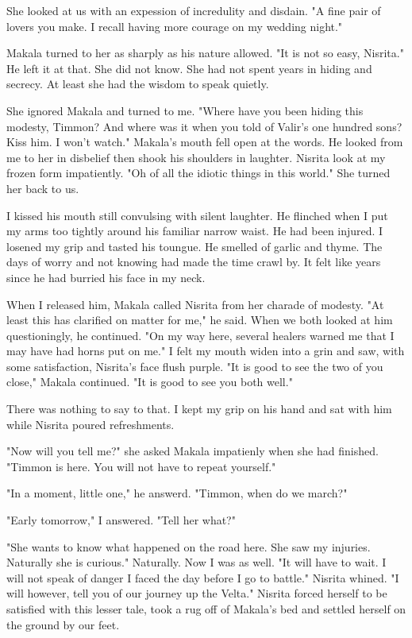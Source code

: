 \documentclass{article}
\begin{document}
She looked at us with an expession of incredulity and disdain. "A fine pair of lovers you make. I recall having more courage on my wedding night." 

Makala turned to her as sharply as his nature allowed. "It is not so easy, Nisrita." He left it at that. She did not know. She had not spent years in hiding and secrecy. At least she had the wisdom to speak quietly.

She ignored Makala and turned to me. "Where have you been hiding this modesty, Timmon? And where was it when you told of Valir's one hundred sons? Kiss him. I won't watch." Makala's mouth fell open at the words. He looked from me to her in disbelief then shook his shoulders in laughter. Nisrita look at my frozen form impatiently. "Oh of all the idiotic things in this world." She turned her back to us.

I kissed his mouth still convulsing with silent laughter. He flinched when I put my arms too tightly around his familiar narrow waist. He had been injured. I losened my grip and tasted his toungue. He smelled of garlic and thyme. The days of worry and not knowing had made the time crawl by. It felt like years since he had burried his face in my neck.

When I released him, Makala called Nisrita from her charade of modesty. "At least this has clarified on matter for me," he said. When we both looked at him questioningly, he continued. "On my way here, several healers warned me that I may have had horns put on me." I felt my mouth widen into a grin and saw, with some satisfaction, Nisrita's face flush purple. "It is good to see the two of you close," Makala continued. "It is good to see you both well." 

There was nothing to say to that. I kept my grip on his hand and sat with him while Nisrita poured refreshments. 

"Now will you tell me?" she asked Makala impatienly when she had finished. "Timmon is here. You will not have to repeat yourself." 

"In a moment, little one," he answerd. "Timmon, when do we march?"

"Early tomorrow," I answered. "Tell her what?"

"She wants to know what happened on the road here. She saw my injuries. Naturally she is curious." Naturally. Now I was as well. "It will have to wait. I will not speak of danger I faced the day before I go to battle." Nisrita whined. "I will however, tell you of our journey up the Velta." Nisrita forced herself to be satisfied with this lesser tale, took a rug off of Makala's bed and settled herself on the ground by our feet. 
\end{document}
